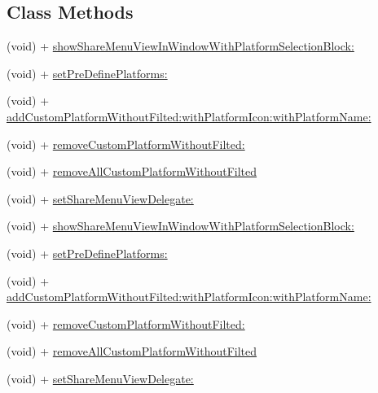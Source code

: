 \subsection*{Class Methods}
\begin{DoxyCompactItemize}
\item 
(void) + \mbox{\hyperlink{interface_u_m_social_u_i_manager_a933b1aa08644baf6edc5c66bf5243d2e}{show\+Share\+Menu\+View\+In\+Window\+With\+Platform\+Selection\+Block\+:}}
\item 
(void) + \mbox{\hyperlink{interface_u_m_social_u_i_manager_ae5565446fb0163b860b188ca76af8c5f}{set\+Pre\+Define\+Platforms\+:}}
\item 
(void) + \mbox{\hyperlink{interface_u_m_social_u_i_manager_a476b572ec6e1b4a7a33c4cd66df8f343}{add\+Custom\+Platform\+Without\+Filted\+:with\+Platform\+Icon\+:with\+Platform\+Name\+:}}
\item 
(void) + \mbox{\hyperlink{interface_u_m_social_u_i_manager_ab914751a51259412e5b4a50bdc0b6506}{remove\+Custom\+Platform\+Without\+Filted\+:}}
\item 
(void) + \mbox{\hyperlink{interface_u_m_social_u_i_manager_a426a589ce95c4d2852b42397b27b7645}{remove\+All\+Custom\+Platform\+Without\+Filted}}
\item 
(void) + \mbox{\hyperlink{interface_u_m_social_u_i_manager_a8480265f40588af964bd7b639af74edd}{set\+Share\+Menu\+View\+Delegate\+:}}
\item 
(void) + \mbox{\hyperlink{interface_u_m_social_u_i_manager_a933b1aa08644baf6edc5c66bf5243d2e}{show\+Share\+Menu\+View\+In\+Window\+With\+Platform\+Selection\+Block\+:}}
\item 
(void) + \mbox{\hyperlink{interface_u_m_social_u_i_manager_ae5565446fb0163b860b188ca76af8c5f}{set\+Pre\+Define\+Platforms\+:}}
\item 
(void) + \mbox{\hyperlink{interface_u_m_social_u_i_manager_a476b572ec6e1b4a7a33c4cd66df8f343}{add\+Custom\+Platform\+Without\+Filted\+:with\+Platform\+Icon\+:with\+Platform\+Name\+:}}
\item 
(void) + \mbox{\hyperlink{interface_u_m_social_u_i_manager_ab914751a51259412e5b4a50bdc0b6506}{remove\+Custom\+Platform\+Without\+Filted\+:}}
\item 
(void) + \mbox{\hyperlink{interface_u_m_social_u_i_manager_a426a589ce95c4d2852b42397b27b7645}{remove\+All\+Custom\+Platform\+Without\+Filted}}
\item 
(void) + \mbox{\hyperlink{interface_u_m_social_u_i_manager_a8480265f40588af964bd7b639af74edd}{set\+Share\+Menu\+View\+Delegate\+:}}
\end{DoxyCompactItemize}


